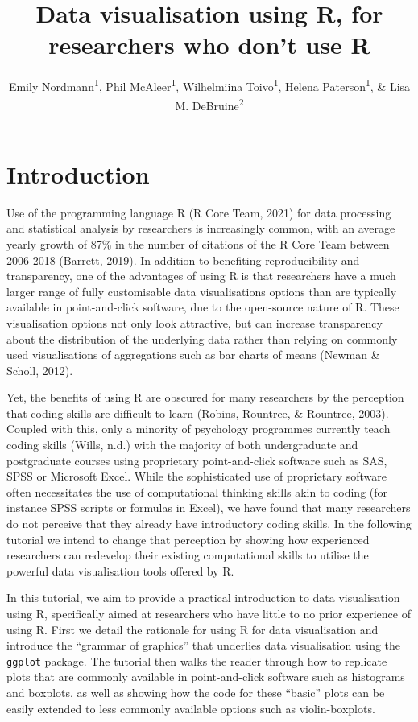 \documentclass[
  english,
  doc,floatsintext]{apa6}
\title{Data visualisation using R, for researchers who don't use R}
\author{Emily Nordmann\textsuperscript{1}, Phil McAleer\textsuperscript{1}, Wilhelmiina Toivo\textsuperscript{1}, Helena Paterson\textsuperscript{1}, \& Lisa M. DeBruine\textsuperscript{2}}
\date{}
\affiliation{\vspace{0.5cm}\textsuperscript{1} School of Psychology, University of Glasgow\\\textsuperscript{2} Institute of Neuroscience and Psychology, University of Glasgow}
\begin{document}
\maketitle

\hypertarget{introduction}{%
\section{Introduction}\label{introduction}}

Use of the programming language R (R Core Team, 2021) for data processing and statistical analysis by researchers is increasingly common, with an average yearly growth of 87\% in the number of citations of the R Core Team between 2006-2018 (Barrett, 2019). In addition to benefiting reproducibility and transparency, one of the advantages of using R is that researchers have a much larger range of fully customisable data visualisations options than are typically available in point-and-click software, due to the open-source nature of R. These visualisation options not only look attractive, but can increase transparency about the distribution of the underlying data rather than relying on commonly used visualisations of aggregations such as bar charts of means (Newman \& Scholl, 2012).

Yet, the benefits of using R are obscured for many researchers by the perception that coding skills are difficult to learn (Robins, Rountree, \& Rountree, 2003). Coupled with this, only a minority of psychology programmes currently teach coding skills (Wills, n.d.) with the majority of both undergraduate and postgraduate courses using proprietary point-and-click software such as SAS, SPSS or Microsoft Excel. While the sophisticated use of proprietary software often necessitates the use of computational thinking skills akin to coding (for instance SPSS scripts or formulas in Excel), we have found that many researchers do not perceive that they already have introductory coding skills. In the following tutorial we intend to change that perception by showing how experienced researchers can redevelop their existing computational skills to utilise the powerful data visualisation tools offered by R.

In this tutorial, we aim to provide a practical introduction to data visualisation using R, specifically aimed at researchers who have little to no prior experience of using R. First we detail the rationale for using R for data visualisation and introduce the ``grammar of graphics'' that underlies data visualisation using the \texttt{ggplot} package. The tutorial then walks the reader through how to replicate plots that are commonly available in point-and-click software such as histograms and boxplots, as well as showing how the code for these ``basic'' plots can be easily extended to less commonly available options such as violin-boxplots.
\end{document}
